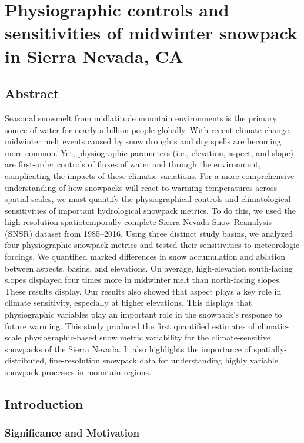 \hypertarget{ch2}{%
\chapter{Physiographic controls and sensitivities of midwinter snowpack in Sierra Nevada, CA}\label{ch2}}

\hypertarget{ch2-abstract}{\section{Abstract}\label{ch2-abstract}}


Seasonal snowmelt from midlatitude mountain environments is the primary source of water for nearly a billion people globally. With recent climate change, midwinter melt events caused by snow droughts and dry spells are becoming more common. Yet, physiographic parameters (i.e., elevation, aspect, and slope) are first-order controls of fluxes of water and through the environment, complicating the impacts of these climatic variations. For a more comprehensive understanding of how snowpacks will react to warming temperatures across spatial scales, we must quantify the physiographical controls and climatological sensitivities of important hydrological snowpack metrics. To do this, we used the high-resolution spatiotemporally complete Sierra Nevada Snow Reanalysis (SNSR) dataset from 1985--2016. Using three distinct study basins, we analyzed four physiographic snowpack metrics and tested their sensitivities to meteorologic forcings. We quantified marked differences in snow accumulation and ablation between aspects, basins, and elevations. On average, high-elevation south-facing slopes displayed four times more in midwinter melt than north-facing slopes. These results display. Our results also showed that aspect plays a key role in climate sensitivity, especially at higher elevations. This displays that physiographic variables play an important role in the snowpack's response to future warming. This study produced the first quantified estimates of climatic-scale physiographic-based snow metric variability for the climate-sensitive snowpacks of the Sierra Nevada. It also highlights the importance of spatially-distributed, fine-resolution snowpack data for understanding highly variable snowpack processes in mountain regions.

\hypertarget{ch2-intro}{\section{Introduction}\label{ch2-intro}}
\hypertarget{ch2-intro-1}{\subsection{Significance and Motivation}\label{ch2-intro-1}}


